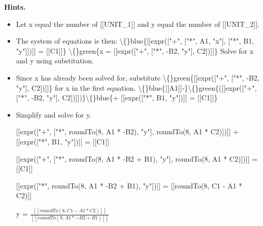 \documentclass{article}
\begin{document}
\textbf{Hints.}
\begin{itemize}
  \item Let x equal the number of [[UNIT\_1]] and y equal the number of [[UNIT\_2]].
  \item The system of equations is then:
                        \textbackslash\{\}blue\{[[expr(["+", ["*", A1, "x"], ["*", B1, "y"]])]] = [[C1]]\}
                        \textbackslash\{\}green\{x = [[expr(["+", ["*", -B2, "y"], C2])]]\}
                        Solve for x and y using substitution.
  \item Since x has already been solved for, substitute \textbackslash\{\}green\{[[expr(["+", ["*", -B2, "y"], C2])]]\} for x in the first equation.
                        \textbackslash\{\}blue\{[[A1]]-\}\textbackslash\{\}green\{([[expr(["+", ["*", -B2, "y"], C2])]])\}\textbackslash\{\}blue\{+ [[expr(["*", B1, "y"])]] = [[C1]]\}
  \item Simplify and solve for y.
                        
                            [[expr(["+", ["*", roundTo(8, A1 * -B2), "y"], roundTo(8, A1 * C2)])]] + [[expr(["*", B1, "y"])]] = [[C1]]
                        
                        
                            [[expr(["+", ["*", roundTo(8, A1 * -B2 + B1), "y"], roundTo(8, A1 * C2)])]] = [[C1]]
                        
                        
                            [[expr(["*", roundTo(8, A1 * -B2 + B1), "y"])]] = [[roundTo(8, C1 - A1 * C2)]]
                        
                        
                            y = $\frac{[[roundTo(8, C1 - A1 * C2)]]}{[[roundTo( 8, A1 * -B2 + B1 )]]}$
                        

\end{itemize}
\end{document}
